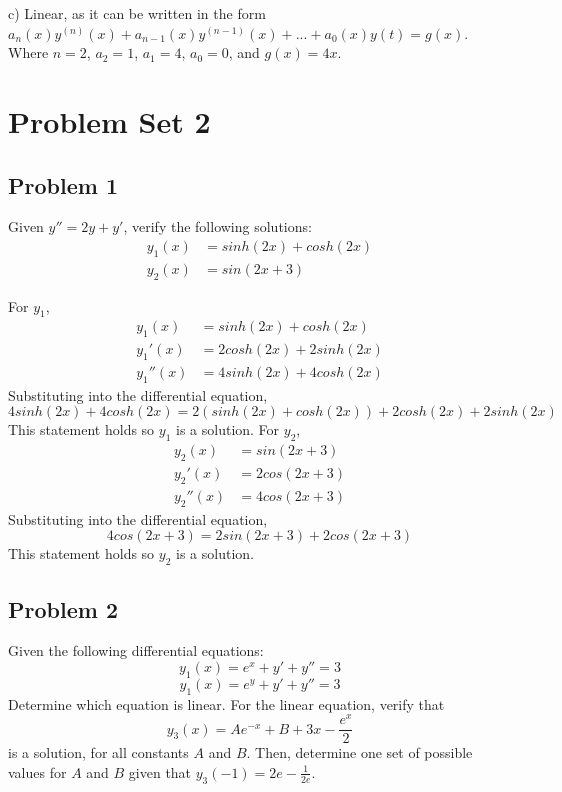 \documentclass[titlepage]{article}
\begin{document}
\vspace{1em}
\noindent
c) Linear, as it can be written in the form
$a_n(x)y^{(n)}(x) + a_{n-1}(x)y^{(n-1)}(x) + ... + a_0(x)y(t) = g(x)$.
Where $n = 2$,
$a_2 = 1$,
$a_1 = 4$,
$a_0 = 0$, and
$g(x) = 4x$.

\noindent
\section{Problem Set 2}
\subsection{Problem 1}
Given $y'' = 2y + y'$, verify the following solutions:
\begin{align*}
y_1(x) &= sinh(2x) + cosh(2x)
\\ y_2(x) &= sin(2x+3)
\end{align*}

For $y_1$,
\begin{align*}
y_1(x) &= sinh(2x) + cosh(2x)
\\ y_1'(x) &= 2cosh(2x) + 2sinh(2x)
\\ y_1''(x) &= 4sinh(2x) + 4cosh(2x)
\end{align*}
Substituting into the differential equation,
$$4sinh(2x) + 4cosh(2x) = 2(sinh(2x) + cosh(2x)) + 2cosh(2x) + 2sinh(2x)$$
This statement holds so $y_1$ is a solution. For $y_2$,
\begin{align*}
y_2(x) &= sin(2x+3)
\\ y_2'(x) &= 2cos(2x+3)
\\ y_2''(x) &= 4cos(2x+3)
\end{align*}
Substituting into the differential equation,
$$4cos(2x+3) = 2sin(2x+3) + 2cos(2x+3)$$
This statement holds so $y_2$ is a solution.

\subsection{Problem 2}
Given the following differential equations:
$$y_1(x) = e^x + y' + y'' = 3$$
$$y_1(x) = e^y + y' + y'' = 3$$
Determine which equation is linear. For the linear equation, verify that
$$y_3(x) = Ae^{-x} + B + 3x - \frac{e^x}{2}$$
is a solution, for all constants $A$ and $B$. Then, determine one set of possible values for $A$ and $B$ given that $y_3(-1) = 2e - \frac{1}{2e}$.
\end{document}
